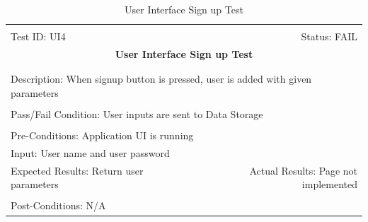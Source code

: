 \documentclass[11pt]{article}
\begin{document}
\begin{center}
\begin{table}[H]
\begin{tabular}{|l r|}\hline&\\[-2mm]
	Test ID: UI4	&Status: FAIL \\[-3mm]
	\multicolumn{2}{|c|}{\textbf{\large{User Interface Sign up Test}}}\\&\\\hline&\\[-3mm]
	\multicolumn{2}{|p{\textwidth}|}{Description: When signup button is pressed, user is added with given parameters}\\[1mm]\hline&\\[-3mm]
	\multicolumn{2}{|p{\textwidth}|}{Pass/Fail Condition: User inputs are sent to Data Storage}\\[1mm]\hline&\\[-3mm]
	\multicolumn{2}{|p{\textwidth}|}{Pre-Conditions: Application UI is running}\\[4mm]
	\multicolumn{2}{|p{\textwidth}|}{Input: User name and user password}\\[2mm]\hline
	\multicolumn{1}{|p{0.49\textwidth}}{Expected Results: Return user parameters}	&\multicolumn{1}{|p{0.45\textwidth}|}{Actual Results: Page not implemented}\\\hline&\\[-3mm]
	\multicolumn{2}{|p{\textwidth}|}{Post-Conditions: N/A}\\\hline
\end{tabular}
\caption{User Interface Sign up Test}
\end{table}
\end{center}
\end{document}
